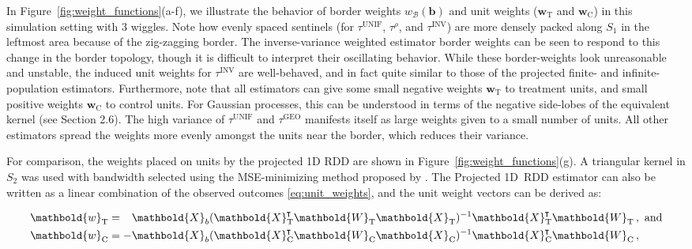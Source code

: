 \documentclass[letter]{article}
\newcommand*{\trans}{^{\mkern-1.5mu\intercal}}
\newcommand{\treat}{\mathrm{T}}
\newcommand{\ctrol}{\mathrm{C}}
\newcommand{\wvec}{\mathbold{w}}
\newcommand{\border}{\mathcal{B}}
\newcommand{\sentinel}{\bm{b}}
\newcommand{\unifavg}{\tau^{\mathrm{UNIF}}}
\newcommand{\invvar}{\tau^{\mathrm{INV}}}
\newcommand{\taurho}{\tau^{\rho}}
\newcommand{\taugeo}{\tau^{\mathrm{GEO}}}
\newcommand{\eqlabel}[1]{\label{#1}}
\newcommand{\weightb}{w_{\border}}
\newcommand{\wt}{\wvec_{\treat}}
\newcommand{\wc}{\wvec_{\ctrol}}
\newcommand{\Xmat}{\mathbold{X}}
\newcommand{\Wmat}{\mathbold{W}}
\renewcommand{\cite}[1]{\citet{#1}}
\begin{document}
    	In Figure~\ref{fig:weight_functions}(a-f), we illustrate the behavior of border weights \(\weightb(\sentinel)\) and unit weights (\(\wt\) and \(\wc\)) in this simulation setting with 3 wiggles.
Note how evenly spaced sentinels (for \(\unifavg\), \(\taurho\), and \(\invvar\)) are more densely packed along \(S_1\) in the leftmost area because of the zig-zagging border.
The inverse-variance weighted estimator border weights can be seen to respond to this change in the border topology, though it is difficult to interpret their oscillating behavior.
While these border-weights look unreasonable and unstable, the induced unit weights for \(\invvar\) are well-behaved, and in fact quite similar to those of the projected finite- and infinite-population estimators.
Furthermore, note that all estimators can give some small negative weights \(\wt\) to treatment units, and small positive weights \(\wc\) to control units.
For Gaussian processes, this can be understood in terms of the negative side-lobes of the equivalent kernel (see \cite{rasmussen2006gaussian} Section 2.6).
The high variance of \(\unifavg\) and \(\taugeo\) manifests itself as large weights given to a small number of units.
All other estimators spread the weights more evenly amongst the units near the border, which reduces their variance.
    


    	For comparison, the weights placed on units by the projected 1D RDD are shown in Figure~\ref{fig:weight_functions}(g).
A triangular kernel in \(S_2\) was used with bandwidth selected using the MSE-minimizing method proposed by \cite{imbens2012optimal}.
The Projected 1D~RDD estimator can also be written as a linear combination of the observed outcomes \eqref{eq:unit_weights}, and the unit weight vectors can be derived as:

\begin{equation}
\begin{split}
\wt &= \hphantom{-} \Xmat_b (\Xmat_\treat\trans \Wmat_\treat \Xmat_\treat)^{-1} \Xmat_\treat\trans \Wmat_\treat \,, 
\text{ and}
\\
\wc &= - \Xmat_b (\Xmat_\ctrol\trans \Wmat_\ctrol \Xmat_\ctrol)^{-1} \Xmat_\ctrol\trans \Wmat_\ctrol \,, 
\end{split}
\eqlabel{eq:unit_weights_llr}
\end{equation}
\end{document}
